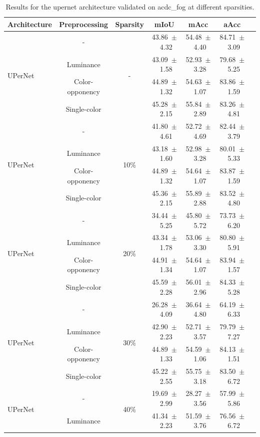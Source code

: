 \begin{table}[h]
\centering
\caption{Results for the upernet architecture validated on acdc_fog at different sparsities.}
\begin{tabular}{@{}lccc ccc@{}}
\toprule
Architecture & Preprocessing & Sparsity & mIoU & mAcc & aAcc \\
\midrule

\multirow{4}{*}{UPerNet} & - & \multirow{4}{*}{-} & 43.86~$\pm$~4.32 & 54.48~$\pm$~4.40 & 84.71~$\pm$~3.09 \\
& Luminance & & 43.09~$\pm$~1.58 & 52.93~$\pm$~3.28 & 79.68~$\pm$~5.25 \\
& Color-opponency & & 44.89~$\pm$~1.32 & 54.63~$\pm$~1.07 & 83.86~$\pm$~1.59 \\
& Single-color & & 45.28~$\pm$~2.15 & 55.84~$\pm$~2.89 & 83.26~$\pm$~4.81 \\
\midrule
\multirow{4}{*}{UPerNet} & - & \multirow{4}{*}{10\%} & 41.80~$\pm$~4.61 & 52.72~$\pm$~4.69 & 82.44~$\pm$~3.79 \\
& Luminance & & 43.18~$\pm$~1.60 & 52.98~$\pm$~3.28 & 80.01~$\pm$~5.33 \\
& Color-opponency & & 44.89~$\pm$~1.32 & 54.64~$\pm$~1.07 & 83.87~$\pm$~1.59 \\
& Single-color & & 45.36~$\pm$~2.15 & 55.89~$\pm$~2.88 & 83.52~$\pm$~4.80 \\
\midrule
\multirow{4}{*}{UPerNet} & - & \multirow{4}{*}{20\%} & 34.44~$\pm$~5.25 & 45.80~$\pm$~5.72 & 73.73~$\pm$~6.20 \\
& Luminance & & 43.34~$\pm$~1.78 & 53.06~$\pm$~3.30 & 80.80~$\pm$~5.91 \\
& Color-opponency & & 44.91~$\pm$~1.34 & 54.64~$\pm$~1.07 & 83.94~$\pm$~1.57 \\
& Single-color & & 45.59~$\pm$~2.28 & 56.01~$\pm$~2.96 & 84.33~$\pm$~5.28 \\
\midrule
\multirow{4}{*}{UPerNet} & - & \multirow{4}{*}{30\%} & 26.28~$\pm$~4.09 & 36.64~$\pm$~4.80 & 64.19~$\pm$~6.33 \\
& Luminance & & 42.90~$\pm$~2.23 & 52.71~$\pm$~3.57 & 79.79~$\pm$~7.27 \\
& Color-opponency & & 44.89~$\pm$~1.33 & 54.59~$\pm$~1.06 & 84.13~$\pm$~1.51 \\
& Single-color & & 45.22~$\pm$~2.55 & 55.75~$\pm$~3.18 & 83.50~$\pm$~6.72 \\
\midrule
\multirow{4}{*}{UPerNet} & - & \multirow{4}{*}{40\%} & 19.69~$\pm$~2.99 & 28.27~$\pm$~3.56 & 57.99~$\pm$~5.86 \\
& Luminance & & 41.34~$\pm$~2.23 & 51.59~$\pm$~3.76 & 76.56~$\pm$~6.72 \\

\end{tabular}
\end{table}
